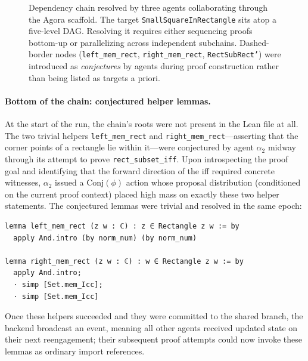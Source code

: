 \begin{figure}[ht]
{
}
\caption{Dependency chain resolved by three agents collaborating through the Agora scaffold. The target \texttt{SmallSquareInRectangle} sits atop a five-level DAG. Resolving it requires either sequencing proofs bottom-up or parallelizing across independent subchains. Dashed-border nodes (\texttt{left\_mem\_rect}, \texttt{right\_mem\_rect}, \texttt{RectSubRect'}) were introduced as \emph{conjectures} by agents during proof construction rather than being listed as targets a priori.}
\label{fig:case-study-chain}
\end{figure}
 
 
\paragraph{Bottom of the chain: conjectured helper lemmas.}
At the start of the run, the chain's roots were not present in the Lean file at all. The two trivial helpers \texttt{left\_mem\_rect} and \texttt{right\_mem\_rect}---asserting that the corner points of a rectangle lie within it---were conjectured by agent $\alpha_2$ midway through its attempt to prove \texttt{rect\_subset\_iff}. Upon introspecting the proof goal and identifying that the forward direction of the iff required concrete witnesses, $\alpha_2$ issued a $\mathrm{Conj}(\phi)$ action whose proposal distribution (conditioned on the current proof context) placed high mass on exactly these two helper statements. The conjectured lemmas were trivial and resolved in the same epoch:
 
\begin{lstlisting}[caption={Conjectured leaf lemmas, introduced and resolved by $\alpha_2$ at epoch $t\!\approx\!1500\,\mathrm{s}$ (lines 499--509).},label={lst:leaves}]
lemma left_mem_rect (z w : ℂ) : z ∈ Rectangle z w := by
  apply And.intro (by norm_num) (by norm_num)
 
lemma right_mem_rect (z w : ℂ) : w ∈ Rectangle z w := by
  apply And.intro;
  · simp [Set.mem_Icc];
  · simp [Set.mem_Icc]
\end{lstlisting}
 
Once these helpers succeeded and they were committed to the shared branch, the backend broadcast an event, meaning all other agents received updated state on their next reengagement; their subsequent proof attempts could now invoke these lemmas as ordinary import references.

